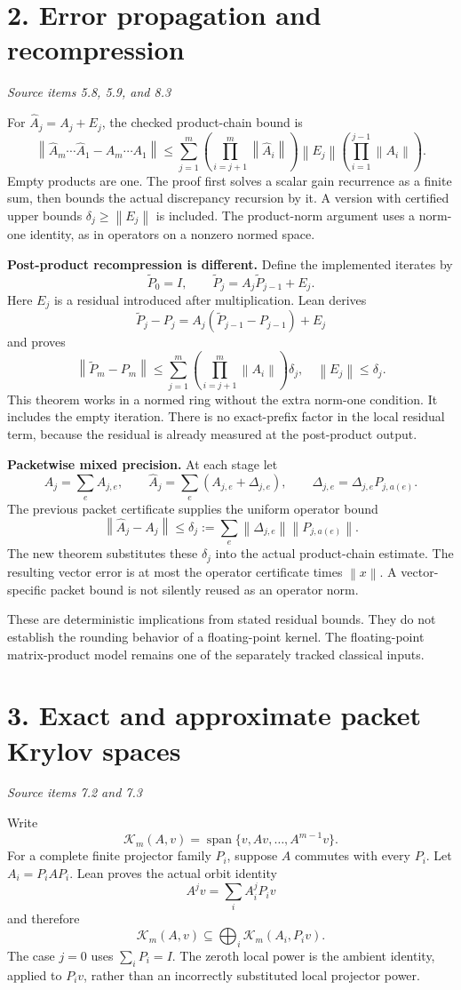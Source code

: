 \documentclass[11pt]{article}
\newcommand{\pageheading}[2]{\section*{\color{ink}#1}\textit{#2}\par}
\newcommand{\norm}[1]{\left\lVert#1\right\rVert}
\begin{document}
\newpage
\pageheading{2. Error propagation and recompression}{Source items 5.8, 5.9, and 8.3}
For $\widehat A_j=A_j+E_j$, the checked product-chain bound is
\[
\boxed{
\norm{\widehat A_m\cdots\widehat A_1-A_m\cdots A_1}
\leq\sum_{j=1}^m
 \left(\prod_{i=j+1}^m\norm{\widehat A_i}\right)
 \norm{E_j}
 \left(\prod_{i=1}^{j-1}\norm{A_i}\right).}
\]
Empty products are one. The proof first solves a scalar gain recurrence as a finite sum, then bounds the actual discrepancy recursion by it. A version with certified upper bounds $\delta_j\geq\norm{E_j}$ is included. The product-norm argument uses a norm-one identity, as in operators on a nonzero normed space.

\textbf{Post-product recompression is different.} Define the implemented iterates by
\[
\widetilde P_0=I,\qquad
\widetilde P_j=A_j\widetilde P_{j-1}+E_j.
\]
Here $E_j$ is a residual introduced after multiplication. Lean derives
\[
\widetilde P_j-P_j=A_j(\widetilde P_{j-1}-P_{j-1})+E_j
\]
and proves
\[
\boxed{\norm{\widetilde P_m-P_m}
\leq\sum_{j=1}^m\left(\prod_{i=j+1}^m\norm{A_i}\right)\delta_j,
\quad \norm{E_j}\leq\delta_j.}
\]
This theorem works in a normed ring without the extra norm-one condition. It includes the empty iteration. There is no exact-prefix factor in the local residual term, because the residual is already measured at the post-product output.

\textbf{Packetwise mixed precision.} At each stage let
\[
A_j=\sum_e A_{j,e},\qquad
\widehat A_j=\sum_e(A_{j,e}+\Delta_{j,e}),\qquad
\Delta_{j,e}=\Delta_{j,e}P_{j,a(e)}.
\]
The previous packet certificate supplies the uniform operator bound
\[
\norm{\widehat A_j-A_j}\leq
\delta_j:=\sum_e\norm{\Delta_{j,e}}\norm{P_{j,a(e)}}.
\]
The new theorem substitutes these $\delta_j$ into the actual product-chain estimate. The resulting vector error is at most the operator certificate times $\norm{x}$. A vector-specific packet bound is not silently reused as an operator norm.

These are deterministic implications from stated residual bounds. They do not establish the rounding behavior of a floating-point kernel. The floating-point matrix-product model remains one of the separately tracked classical inputs.

\newpage
\pageheading{3. Exact and approximate packet Krylov spaces}{Source items 7.2 and 7.3}
Write
\[
\mathcal K_m(A,v)=\operatorname{span}\{v,Av,\ldots,A^{m-1}v\}.
\]
For a complete finite projector family $P_i$, suppose $A$ commutes with every $P_i$. Let $A_i=P_iAP_i$. Lean proves the actual orbit identity
\[
A^jv=\sum_i A_i^jP_iv
\]
and therefore
\[
\boxed{\mathcal K_m(A,v)\subseteq
\bigoplus_i\mathcal K_m(A_i,P_iv).}
\]
The case $j=0$ uses $\sum_iP_i=I$. The zeroth local power is the ambient identity, applied to $P_iv$, rather than an incorrectly substituted local projector power.
\end{document}
